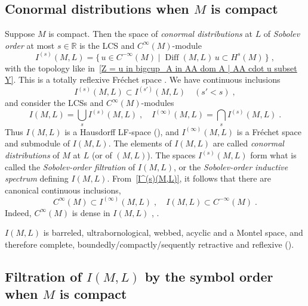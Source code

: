 \documentclass{memo-l}
\theoremstyle{plain}
\theoremstyle{definition}
\theoremstyle{remark}
\newcommand{\R}{\mathbb{R}}
\newcommand{\Diff}{\operatorname{Diff}}
\newcommand{\co}{{\text{\rm c}}}
\numberwithin{section}{chapter}
\numberwithin{equation}{section}%
\begin{document}
\subsection{Conormal distributions when $M$ is compact}\label{ss: conormal - Sobolev order - compact} 

Suppose $M$ is compact. Then the space of \emph{conormal distributions}  at $L$ of \emph{Sobolev order} at most $s\in\R$ is the LCS and $C^\infty(M)$-module \index{$I^{(s)}_{{\cdot}/\co}(M,L)$} \index{$I_{{\cdot}/\co}(M,L)$}
\begin{equation}\label{I^(s)(M,L)}
I^{(s)}(M,L)=\{\,u\in C^{-\infty}(M)\mid\Diff(M,L)\,u\subset H^s(M)\,\}\;,
\end{equation}
with the topology like in~\eqref{Z = u in bigcup_A in AA dom A | AA cdot u subset Y}. This is a totally reflexive Fr\'echet space \cite[Proposition~4.1]{AlvKordyLeichtnam-conormal}. We have continuous inclusions
\begin{equation}\label{I^(s)(M L) subset I^(s')(M L)}
I^{(s)}(M,L)\subset I^{(s')}(M,L)\quad(s'<s)\;,
\end{equation}
and consider the LCSs and $C^\infty(M)$-modules  
\[
I(M,L)=\bigcup_sI^{(s)}(M,L)\;,\quad I^{(\infty)}(M,L)=\bigcap_sI^{(s)}(M,L)\;.
\]
Thus $I(M,L)$ is a Hausdorff LF-space (), and $I^{(\infty)}(M,L)$ is a Fr\'echet space and submodule of $I(M,L)$. The elements of $I(M,L)$ are called \emph{conormal distributions} of $M$ at $L$ (or of $(M,L)$). The spaces $I^{(s)}(M,L)$ form what is called the \emph{Sobolev-order filtration} of $I(M,L)$, or the \emph{Sobolev-order inductive spectrum} defining $I(M,L)$. From~\eqref{I^(s)(M,L)}, it follows that there are canonical continuous inclusions,
\begin{equation}\label{C^infty(M) subset I^(infty)(M L)}
C^\infty(M)\subset I^{(\infty)}(M,L)\;,\quad I(M,L)\subset C^{-\infty}(M)\;.
\end{equation}
Indeed, $C^\infty(M)$ is dense in $I(M,L)$ \cite[Eq.~(6.2.12)]{Melrose1996}, \cite[Corollary~4.6]{AlvKordyLeichtnam-conormal}.

$I(M,L)$ is barreled, ultrabornological, webbed, acyclic and a Montel space, and therefore complete, boundedly/compactly/sequently retractive and reflexive \cite[Corollaries~4.2 and~4.7]{AlvKordyLeichtnam-conormal}  ().


\subsection{Filtration of $I(M,L)$ by the symbol order when $M$ is compact}
\label{ss: conormal - symbol order - compact}
\end{document}
